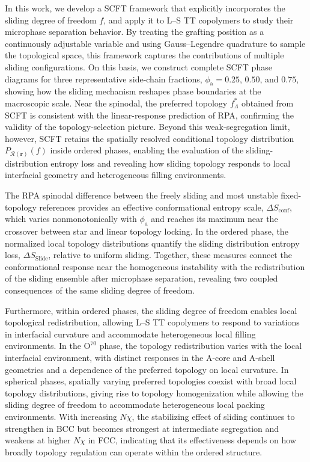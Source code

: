 In this work, we develop a SCFT framework that explicitly incorporates the sliding degree of freedom $f$, and apply it to L--S TT copolymers to study their microphase separation behavior.
By treating the grafting position as a continuously adjustable variable and using Gauss--Legendre quadrature to sample the topological space, this framework captures the contributions of multiple sliding configurations.
On this basis, we construct complete SCFT phase diagrams for three representative side-chain fractions, $\phi_{\mathrm a}=0.25$, $0.50$, and $0.75$, showing how the sliding mechanism reshapes phase boundaries at the macroscopic scale.
Near the spinodal, the preferred topology $f_\Lambda^\ast$ obtained from SCFT is consistent with the linear-response prediction of RPA, confirming the validity of the topology-selection picture.
Beyond this weak-segregation limit, however, SCFT retains the spatially resolved conditional topology distribution $P_{\mathcal R(\bm r)}(f)$ inside ordered phases, enabling the evaluation of the sliding-distribution entropy loss and revealing how sliding topology responds to local interfacial geometry and heterogeneous filling environments.



The RPA spinodal difference between the freely sliding and most unstable fixed-topology references provides an effective conformational entropy scale, $\Delta S_{\mathrm{conf}}$, which varies nonmonotonically with $\phi_{\mathrm a}$ and reaches its maximum near the crossover between star and linear topology locking.
In the ordered phase, the normalized local topology distributions quantify the sliding distribution entropy loss, $\Delta S_{\mathrm{Slide}}$, relative to uniform sliding.
Together, these measures connect the conformational response near the homogeneous instability with the redistribution of the sliding ensemble after microphase separation, revealing two coupled consequences of the same sliding degree of freedom.



Furthermore, within ordered phases, the sliding degree of freedom enables local topological redistribution, allowing L--S TT copolymers to respond to variations in interfacial curvature and accommodate heterogeneous local filling environments.
In the $\mathrm{O}^{70}$ phase, the topology redistribution varies with the local interfacial environment, with distinct responses in the A-core and A-shell geometries and a dependence of the preferred topology on local curvature.
In spherical phases, spatially varying preferred topologies coexist with broad local topology distributions, giving rise to topology homogenization while allowing the sliding degree of freedom to accommodate heterogeneous local packing environments.
With increasing $N\chi$, the stabilizing effect of sliding continues to strengthen in BCC but becomes strongest at intermediate segregation and weakens at higher $N\chi$ in FCC, indicating that its effectiveness depends on how broadly topology regulation can operate within the ordered structure.

